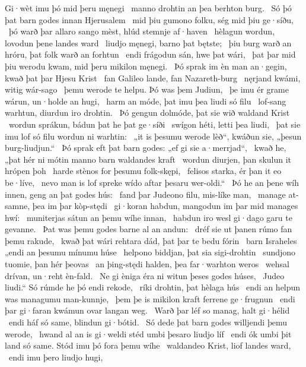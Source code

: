 Gi·wèt imu þó mid þeru męnegi \hld\ manno drohtin
an þea berhton burg. \hld\ Só þó þat barn godes
innan Hjerusalem \hld\ mid þiu gumono folku,
ség mid þiu ge·síðu, \hld\ þó warð þar allaro sango mèst,
hlúd stemnje af·haven \hld\ hèlagun wordun,
lovodun þene landes ward \hld\ liudjo męnegi,
barno þat bętste; \hld\ þiu burg warð an hróru,
þat folk warð an forhtun \hld\ endi frágodun sán,
hwe þat wári, \hld\ þat þar mid þiu werodu kwam,
mid þeru mikilon męnegi. \hld\ Þó sprak im èn man an·gegin,
kwað þat þar Hjesu Krist \hld\ fan Galileo lande,
fan Nazareth-burg \hld\ nęrjand kwámi,
witig wár-sago \hld\ þemu werode te helpu.
Þó was þem Judiun, \hld\ þe imu ér grame wárun,
un·holde an hugi, \hld\ harm an móde,
þat imu þea liudi só filu \hld\ lof-sang warhtun,
diurdun iro drohtin. \hld\ Þó gengun dolmóde,
þat sie wið waldand Krist \hld\ wordun sprákun,
bádun þat he þat ge·síði \hld\ swígon héti,
letti þea liudi, \hld\ þat sie imu lof só filu
wordun ni warhtin: \hld\ „it is þesumu werode lèð“, kwáðun sie,
„þesun burg-liudjun.“ \hld\ Þó sprak eft þat barn godes:
„ef gi sie a·merrjad“, \hld\ kwað he, „þat hér ni mótin manno barn
waldandes kraft \hld\ wordun diurjen,
þan skulun it hrópen þoh \hld\ harde stènos
for þesumu folk-skępi, \hld\ felisos starka,
ér þan it eo be·líve, \hld\ nevo man is lof spreke
wído aftar þesaru wer-oldi.“ \hld\ Þó he an þene wíh innen,
geng an þat godes hús: \hld\ fand þar Judeono filu,
mis-líke man, \hld\ manage at-samne,
þea im þar kòp-stędi \hld\ gi·koran habdun,
mangodun im þar mid manages hwí: \hld\ muniterjas sátun
an þemu wíhe innan, \hld\ habdun iro wesl gi·dago
garu te gevanne. \hld\ Þat was þemu godes barne
al an andun: \hld\ dréf sie ut þanen
rúmo fan þemu rakude, \hld\ kwað þat wári rehtara dád,
þat þar te bedu fórin \hld\ barn Israheles
„endi an þesumu mínumu húse \hld\ helpono biddjan,
þat sia sigi-drohtin \hld\ sundjono tuomie,
þan hér þeovas \hld\ an þing-stędi halden,
þea far·warhton weros \hld\ wehsal drívan,
un·reht èn-fald. \hld\ Ne gi èniga éra ni witun
þeses godes húses, \hld\ Judeo liudi.“
Só rúmde he þó endi rekode, \hld\ ríki drohtin,
þat hèlaga hús \hld\ endi an helpun was
managumu man-kunnje, \hld\ þem þe is mikilon kraft
ferrene ge·frugnun \hld\ endi þar gi·faran kwámun
ovar langan weg. \hld\ Warð þar léf so manag,
halt gi·hélid \hld\ endi háf só same,
blindun gi·bótid. \hld\ Só dede þat barn godes
willjendi þemu werode, \hld\ hwand al an is gi·weldi stéd
umbi þesaro liudjo líf \hld\ endi ók umbi þit land só same.
Stód imu þó fora þemu wíhe \hld\ waldandeo Krist,
liof landes ward, \hld\ endi imu þero liudjo hugi,
